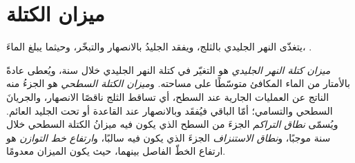 \section{ميزان الكتلة}\label{sec:b3:glaciology:mass-balance}

يتغذّى النهر الجليدي بالثلج، ويفقد الجليدُ بالانصهار والتبخّر، وحيثما
يبلغ الماءَ، .

\begin{definition}\label{def:b3:glaciology:mass-balance}
\emph{ميزان كتلة النهر الجليدي} هو التغيّر في كتلة
النهر الجليدي خلال سنة، ويُعطى عادةً بالأمتار من الماء
المكافئ متوسّطًا على مساحته. و\emph{ميزان الكتلة السطحي} هو
الجزءُ منه الناتج عن العمليات الجارية عند السطح، أي تساقط الثلج ناقصًا الانصهار،
والجريانَ السطحي والتسامي؛ أمّا الباقي فيُفقَد
 وبالانصهار عند القاعدة أو تحت الجليد العائم. ويُسمّى
\emph{نطاق التراكم} الجزءَ من السطح الذي يكون فيه ميزانُ الكتلة السطحي
خلال سنة موجبًا،
و\emph{نطاق الاستنزاف} الجزءَ الذي يكون فيه سالبًا،
و\emph{ارتفاع خط التوازن}
 هو ارتفاع الخطّ الفاصل بينهما، حيث يكون الميزان معدومًا.
\end{definition}

